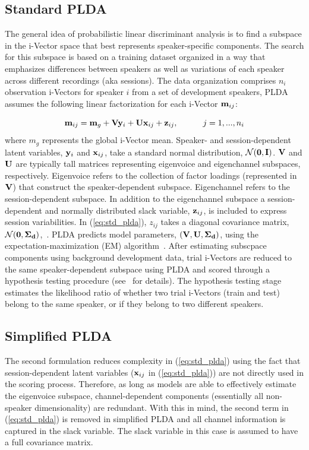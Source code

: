 \subsection{Standard PLDA}
\label{ssec:standard_plda}
The general idea of probabilistic linear discriminant analysis is to find a subspace in the i-Vector space that best represents speaker-specific components. 
The search for this subspace is based on a training dataset organized in a way that emphasizes differences between speakers as well as variations of each speaker across different recordings (aka sessions). 
The data organization comprises $n_i$ observation i-Vectors for speaker $i$ from a set of development speakers, PLDA assumes the following linear factorization for each i-Vector ${\bf m}_{ij}$: 

\begin{equation}
\label{eq:std_plda}
{\bf m}_{ij} = {\bf m}_g + {\bf V}{\bf y}_i+{\bf U}{\bf x}_{ij}+{\bf z}_{ij},  \hspace{30pt} j=1,...,n_i
\end{equation}
where $m_g$ represents the global i-Vector mean. Speaker- and session-dependent latent variables, ${\bf y}_i$ and ${\bf x}_{ij}$, take a standard normal distribution, $\mathcal{N}({\bf 0},{\bf I})$. ${\bf V}$ and ${\bf U}$ are typically tall matrices representing eigenvoice and eigenchannel subspaces, respectively. Eigenvoice refers to the collection of factor loadings (represented in ${\bf V}$) that construct the speaker-dependent subspace. Eigenchannel refers to the session-dependent subspace. 
In addition to the eigenchannel subspace a session-dependent and normally distributed slack variable, ${\bf z}_{ij}$, is included to express session variabilities. In (\ref{eq:std_plda}), $z_{ij}$ takes a diagonal covariance matrix, $\mathcal{N}({\bf 0},{\bf \Sigma_d})$,~\cite{kenny_plda,prince_plda}. 
PLDA predicts model parameters, $({\bf V},{\bf U},{\bf \Sigma_d})$, using the expectation-maximization (EM) algorithm~\cite{prince_plda}. 
After estimating subscpace components using background development data, trial i-Vectors are reduced to the same speaker-dependent subspace using PLDA and scored through a hypothesis testing procedure (see~\cite{prince_plda} for details). 
The hypothesis testing stage estimates the likelihood ratio of whether two trial i-Vectors (train and test) belong to the same speaker, or if they belong to two different speakers. 

\subsection{Simplified PLDA}
\label{ssec:simplified_plda}
The second formulation reduces complexity in (\ref{eq:std_plda}) using the fact that session-dependent latent variables (${\bf x}_{ij}$ in (\ref{eq:std_plda})) are not directly used in the scoring process. 
Therefore, as long as models are able to effectively estimate the eigenvoice subspace, channel-dependent components (essentially all non-speaker dimensionality) are redundant. 
With this in mind, the second term in (\ref{eq:std_plda}) is removed in simplified PLDA and all channel information is captured in the slack variable. 
The slack variable in this case is assumed to have a full covariance matrix.

